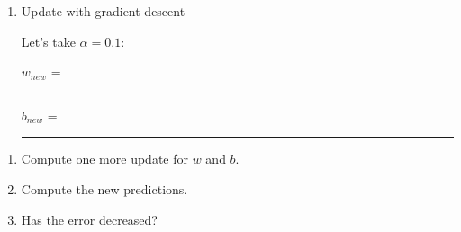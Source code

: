 \documentclass[11pt]{article}
\begin{document}
\begin{enumerate}


For $i=2$:
\bigskip

$(y_2 - \hat{y}_2) t_2$  \rule{5cm}{0.4pt}
\vspace{3cm}


$\frac{\partial E}{\partial w_1}$ =  \rule{5cm}{0.4pt}
\vspace{3cm}

\begin{align*}
\frac{\partial E}{\partial b} &= -\frac{2}{n} \sum_{i=1}^2 (y_i - \hat{y}_i)\\
&= -\frac{2}{2} \left((y_1 - \hat{y}_1) + (y_2 - \hat{y}_2)\right)\\
\end{align*}

For $i=1$:
\[
y_1 - \hat{y}_1 = \rule{5cm}{0.4pt}
\]
\vspace{1.5cm}

For $i=2$:
\[
y_2 - \hat{y}_2 = \rule{5cm}{0.4pt}
\]
\vspace{1.5cm}

\[
\frac{\partial E}{\partial b} = \rule{5cm}{0.4pt}
\]
\vspace{1.5cm}

\item Update with gradient descent

Let's take $\alpha = 0.1$:
\bigskip

$w_{new}$ = \rule{5cm}{0.4pt}
\vspace{2cm}

$b_{new}$ = \rule{5cm}{0.4pt}
\vspace{2cm}

%
\end{enumerate}

\begin{enumerate}
    \item Compute one more update for $w$ and $b$.
    \vspace{4cm}
    
    \item Compute the new predictions.
    \vspace{4cm}
    
    \item Has the error decreased?
    \vspace{4cm}
    
\end{enumerate}
\newpage
\end{document}
